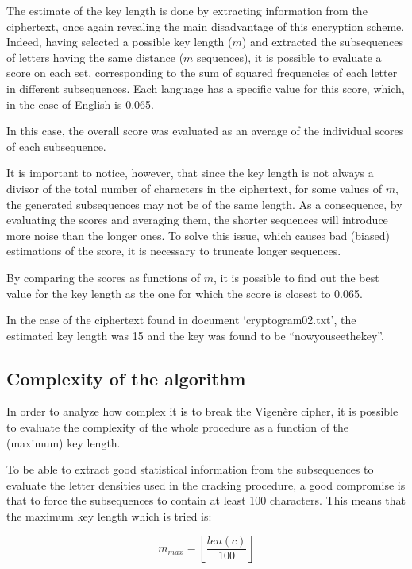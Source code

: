 \documentclass[12pt]{article}
\begin{document}
The estimate of the key length is done by extracting information from the ciphertext, once again revealing the main disadvantage of this encryption scheme.
Indeed, having selected a possible key length ($m$) and extracted the subsequences of letters having the same distance ($m$ sequences), it is possible to evaluate a score on each set, corresponding to the sum of squared frequencies of each letter in different subsequences.
Each language has a specific value for this score, which, in the case of English is 0.065.

In this case, the overall score was evaluated as an average of the individual scores of each subsequence.

It is important to notice, however, that since the key length is not always a divisor of the total number of characters in the ciphertext, for some values of $m$, the generated subsequences may not be of the same length. As a consequence, by evaluating the scores and averaging them, the shorter sequences will introduce more noise than the longer ones. To solve this issue, which causes bad (biased) estimations of the score, it is necessary to truncate longer sequences.

By comparing the scores as functions of $m$, it is possible to find out the best value for the key length as the one for which the score is closest to 0.065.

In the case of the ciphertext found in document `cryptogram02.txt', the estimated key length was 15 and the key was found to be ``nowyouseethekey''.

\subsection{Complexity of the algorithm}

In order to analyze how complex it is to break the Vigenère cipher, it is possible to evaluate the complexity of the whole procedure as a function of the (maximum) key length.

To be able to extract good statistical information from the subsequences to evaluate the letter densities used in the cracking procedure, a good compromise is that to force the subsequences to contain at least 100 characters. This means that the maximum key length which is tried is:

\begin{equation}
  m_{max} = \left\lfloor \frac{len(c)}{100} \right\rfloor
\end{equation}
\end{document}

